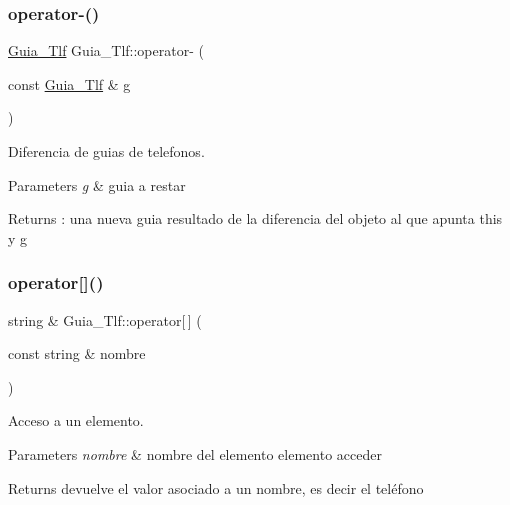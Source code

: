 \subsubsection{\texorpdfstring{operator-\/()}{operator-()}}
{\footnotesize\ttfamily \mbox{\hyperlink{classGuia__Tlf}{Guia\+\_\+\+Tlf}} Guia\+\_\+\+Tlf\+::operator-\/ (\begin{DoxyParamCaption}\item[{const \mbox{\hyperlink{classGuia__Tlf}{Guia\+\_\+\+Tlf}} \&}]{g }\end{DoxyParamCaption})}



Diferencia de guias de telefonos. 


\begin{DoxyParams}{Parameters}
{\em g} & guia a restar \\
\hline
\end{DoxyParams}
\begin{DoxyReturn}{Returns}
\+: una nueva guia resultado de la diferencia del objeto al que apunta this y g 
\end{DoxyReturn}
\mbox{\label{classGuia__Tlf_ab2c734a7f3f3cd63ad95f525502474ea}} 
\subsubsection{\texorpdfstring{operator[]()}{operator[]()}}
{\footnotesize\ttfamily string \& Guia\+\_\+\+Tlf\+::operator\mbox{[}$\,$\mbox{]} (\begin{DoxyParamCaption}\item[{const string \&}]{nombre }\end{DoxyParamCaption})}



Acceso a un elemento. 


\begin{DoxyParams}{Parameters}
{\em nombre} & nombre del elemento elemento acceder \\
\hline
\end{DoxyParams}
\begin{DoxyReturn}{Returns}
devuelve el valor asociado a un nombre, es decir el teléfono 
\end{DoxyReturn}
\mbox{\label{classGuia__Tlf_a0a8ed6b386e90a6799a8693653b3e187}} 
